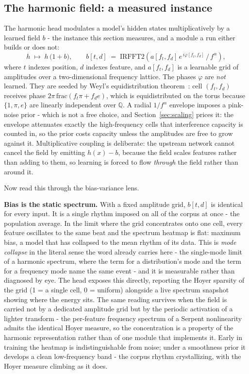 \subsection{The harmonic field: a measured instance}

The harmonic head modulates a model's hidden states multiplicatively by a learned field $b$ - the instance this section measures, and a module a run either builds or does not:\paperFieldInstance{}
\[
    h \;\mapsto\; h \,\bigl(1 + b\bigr), \qquad
    b[t,d] \;=\; \mathrm{IRFFT2}\!\left(a[f_t,f_d]\, e^{\,i\varphi[f_t,f_d]}\, /\, f^{\alpha}\right),
\]
where $t$ indexes position, $d$ indexes feature, and $a[f_t,f_d]$ is a learnable grid of amplitudes over a two-dimensional frequency lattice. The phases $\varphi$ are \textit{not} learned. They are seeded by Weyl's equidistribution theorem~\cite{weyl1916}: cell $(f_t,f_d)$ receives phase $2\pi\,\mathrm{frac}(f_t\pi + f_d e)$, which is equidistributed on the torus because $\{1,\pi,e\}$ are linearly independent over $\mathbb{Q}$. A radial $1/f^{\alpha}$ envelope imposes a pink-noise prior - which is not a free choice, and Section~\ref{sec:scaling} prices it: the envelope attenuates exactly the high-frequency cells that interference capacity is counted in, so the prior costs capacity unless the amplitudes are free to grow against it. Multiplicative coupling is deliberate: the upstream network cannot cancel the field by emitting $h(x)-b$, because the field scales features rather than adding to them, so learning is forced to flow \textit{through} the field rather than around it.

Now read this through the bias-variance lens.

\textbf{Bias is the static spectrum.} With a fixed amplitude grid, $b[t,d]$ is identical for every input. It is a single rhythm imposed on all of the corpus at once - the population average. In the limit where the grid concentrates onto one cell, every feature oscillates to the same beat and the spectrum heatmap is flat: maximum bias, a model that has collapsed to the mean rhythm of its data. This is \textit{mode collapse} in the literal sense the word already carries here - the single-mode limit of a harmonic spectrum, where the term for a distribution's mode and the term for a frequency mode name the same event - and it is measurable rather than diagnosed by eye. The head exposes this directly, reporting the Hoyer sparsity of the grid (1 = a single cell, 0 = uniform) alongside a live spectrum snapshot showing where the energy sits.\paperHoyerConcentration{} The same reading survives when the field is carried not by a dedicated amplitude grid but by the periodic activation of a lighter transform - the per-feature frequency spectrum of a Serpent nonlinearity admits the identical Hoyer measure, so the concentration is a property of the harmonic representation rather than of one module that implements it.\paperMtpFieldConcentration{} Early in training the heatmap is indistinguishable from noise; under a smoothness prior it develops a clean low-frequency band - the corpus rhythm crystallizing, with the Hoyer measure climbing as it does.\paperSpectrumRef{}

